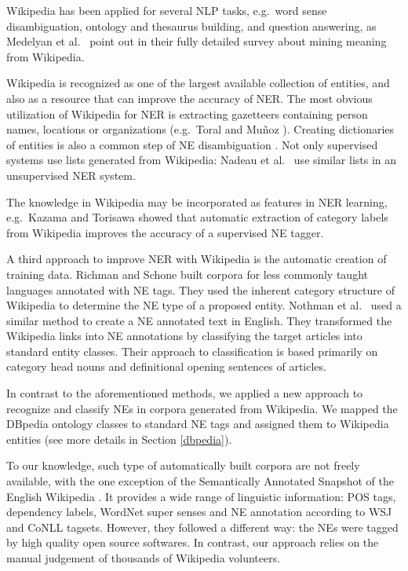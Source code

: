 \documentclass[11pt]{article}
\begin{document}
Wikipedia has been applied for several NLP tasks, e.g.~word sense disambiguation, ontology and thesaurus building, and question answering, as Medelyan et al.~ point out in their fully detailed survey about mining meaning from Wikipedia. 

Wikipedia is recognized as one of the largest available collection of entities, and also as a resource that can improve the accuracy of NER. The most obvious utilization of Wikipedia for NER is extracting gazetteers containing person names, locations or organizations (e.g.~Toral and Mu\~noz ). Creating dictionaries of entities is also a common step of NE disambiguation \cite{Bunescu:06,Cucerzan:07}. Not only supervised systems use lists generated from Wikipedia: Nadeau et al.~ use similar lists in an unsupervised NER system. 

The knowledge in Wikipedia may be incorporated as features in NER learning, e.g.~Kazama and Torisawa  showed that automatic extraction of category labels from Wikipedia improves the accuracy of a supervised NE tagger. 

A third approach to improve NER with Wikipedia is the automatic creation of training data. Richman and Schone  built corpora for less commonly taught languages annotated with NE tags. They used the inherent category structure of Wikipedia to determine the NE type of a proposed entity. Nothman et al.~ used a similar method to create a NE annotated text in English. They transformed the Wikipedia links into NE annotations by classifying the target articles into standard entity classes. Their approach to classification is based primarily on category head nouns and definitional opening sentences of articles. 

In contrast to the aforementioned methods, we applied a new approach to recognize and classify NEs in corpora generated from Wikipedia. We mapped the DBpedia ontology classes to standard NE tags and assigned them to Wikipedia entities (see more details in Section \ref{dbpedia}).

To our knowledge, such type of automatically built corpora are not freely available, with the one exception of the Semantically Annotated Snapshot of the English Wikipedia \cite{Zaragoza:07}. It provides a wide range of linguistic information: POS tags, dependency labels, WordNet super senses and NE annotation according to WSJ and CoNLL tagsets. However, they followed a different way: the NEs were tagged by high quality open source softwares. In contrast, our approach relies on the manual judgement of thousands of Wikipedia volunteers.
\end{document}
